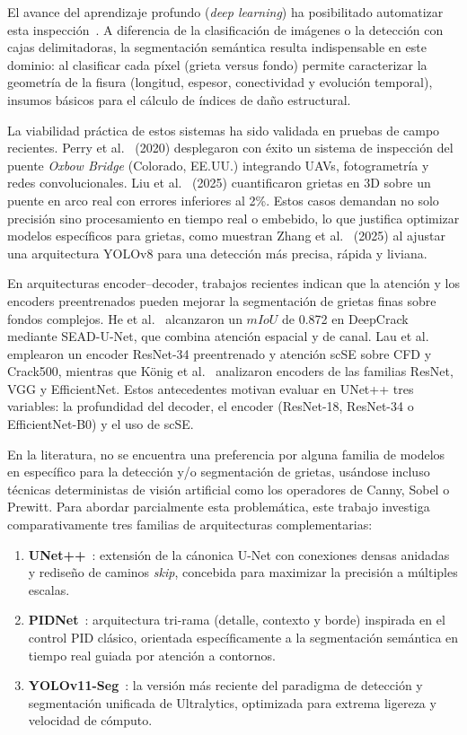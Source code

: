 \documentclass[conference]{IEEEtran}
\begin{document}
El avance del aprendizaje profundo (\textit{deep learning}) ha posibilitado automatizar esta inspección~\cite{liu2025crack}. A diferencia de la clasificación de imágenes o la detección con cajas delimitadoras, la segmentación semántica resulta indispensable en este dominio: al clasificar cada píxel (grieta versus fondo) permite caracterizar la geometría de la fisura (longitud, espesor, conectividad y evolución temporal), insumos básicos para el cálculo de índices de daño estructural.

La viabilidad práctica de estos sistemas ha sido validada en pruebas de campo recientes. Perry et al.~\cite{perry2020streamlined} (2020) desplegaron con éxito un sistema de inspección del puente \textit{Oxbow Bridge} (Colorado, EE.UU.) integrando UAVs, fotogrametría y redes convolucionales. Liu et al.~\cite{liu2025crack} (2025) cuantificaron grietas en 3D sobre un puente en arco real con errores inferiores al 2\%. Estos casos demandan no solo precisión sino procesamiento en tiempo real o embebido, lo que justifica optimizar modelos específicos para grietas, como muestran Zhang et al.~\cite{zhang2025accuracy} (2025) al ajustar una arquitectura YOLOv8 para una detección más precisa, rápida y liviana.

En arquitecturas encoder--decoder, trabajos recientes indican que la atención y los encoders preentrenados pueden mejorar la segmentación de grietas finas sobre fondos complejos. He et al.~\cite{he2023crack} alcanzaron un $mIoU$ de 0.872 en DeepCrack mediante SEAD-U-Net, que combina atención espacial y de canal. Lau et al.~\cite{lau2020automated} emplearon un encoder ResNet-34 preentrenado y atención scSE sobre CFD y Crack500, mientras que König et al.~\cite{konig2021optimized} analizaron encoders de las familias ResNet, VGG y EfficientNet. Estos antecedentes motivan evaluar en UNet++ tres variables: la profundidad del decoder, el encoder (ResNet-18, ResNet-34 o EfficientNet-B0) y el uso de scSE.

En la literatura, no se encuentra una preferencia por alguna familia de modelos en específico para la detección y/o segmentación de grietas, usándose incluso técnicas deterministas de visión artificial como los operadores de Canny, Sobel o Prewitt. Para abordar parcialmente esta problemática, este trabajo investiga comparativamente tres familias de arquitecturas complementarias:
\begin{enumerate}
    \item \textbf{UNet++}~\cite{zhou2018unetplusplus}: extensión de la cánonica U-Net con conexiones densas anidadas y rediseño de caminos \textit{skip}, concebida para maximizar la precisión a múltiples escalas.
    \item \textbf{PIDNet}~\cite{xu2023pidnet}: arquitectura tri-rama (detalle, contexto y borde) inspirada en el control PID clásico, orientada específicamente a la segmentación semántica en tiempo real guiada por atención a contornos.
    \item \textbf{YOLOv11-Seg}~\cite{kahn2024yolo11}: la versión más reciente del paradigma de detección y segmentación unificada de Ultralytics, optimizada para extrema ligereza y velocidad de cómputo.
\end{enumerate}
\end{document}
